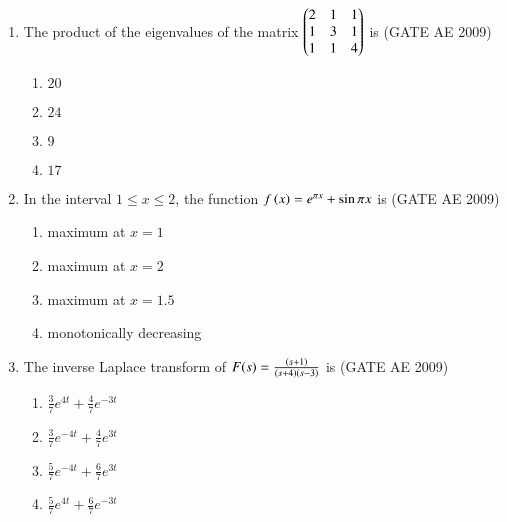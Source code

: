 \documentclass[journal]{IEEEtran}
\begin{document}
\begin{enumerate}
    \item The product of the eigenvalues of the matrix 
    $
    \begin{pmatrix}
    2 & 1 & 1 \\
    1 & 3 & 1 \\
    1 & 1 & 4
    \end{pmatrix}
    $
    is \hfill (GATE AE 2009)
    \begin{multicols}{4}
        \begin{enumerate}
            \item $20$
            \item $24$
            \item $9$
            \item $17$
        \end{enumerate}
    \end{multicols}

    \item In the interval $1 \leq x \leq 2$, the function $f\left(x\right) = e^{\pi x} + \sin \pi x$ is  \hfill (GATE AE 2009)
    \begin{multicols}{2}
        \begin{enumerate}
            \item maximum at $x=1$
            \item maximum at $x=2$
            \item maximum at $x=1.5$
            \item monotonically decreasing
        \end{enumerate}
    \end{multicols}

    \item The inverse Laplace transform of $F(s) = \frac{\left(s+1\right)}{\left(s+4\right)\left(s-3\right)}$ is  \hfill (GATE AE 2009)
    \begin{multicols}{4}
        \begin{enumerate}
            \item $\frac{3}{7}e^{4t} + \frac{4}{7}{e^{-3t}}$
            \item $\frac{3}{7}e^{-4t} + \frac{4}{7}e^{3t}$
            \item $\frac{5}{7}e^{-4t} + \frac{6}{7}e^{3t}$
            \item $\frac{5}{7}e^{4t} + \frac{6}{7}{e^{-3t}}$
        \end{enumerate}
    \end{multicols}
\end{enumerate}
\end{document}
